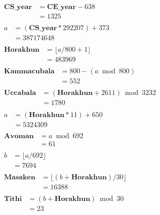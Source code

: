 \documentclass[11pt,oneside]{memoir-article}
\begin{document}
\begin{align}
\begin{split}
   \mathbf{CS\_year} &= \mathbf{CE\_year} - 638\\
                     &= 1325
\end{split}\\
\begin{split}
                   a &= (\mathbf{CS\_year} * 292207) + 373\\
                     &= 387174648
\end{split}\\
\begin{split}
\mathbf{Horakhun}    &= \lfloor a / 800 + 1 \rfloor\\
                     &= 483969
\end{split}\\
\begin{split}
\mathbf{Kammacubala} &= 800 - (a \bmod 800)\\
                     &= 552
\end{split}\\
\begin{split}
\mathbf{Uccabala}    &= (\mathbf{Horakhun} + 2611) \bmod 3232\\
                     &= 1780
\end{split}\\
\begin{split}
                   a &= (\mathbf{Horakhun} * 11) + 650\\
                     &= 5324309
\end{split}\\
\begin{split}
\mathbf{Avoman}      &= a \bmod 692\\
                     &= 61
\end{split}\\
\begin{split}
                   b &= \lfloor a / 692 \rfloor\\
                     &= 7694
\end{split}\\
\begin{split}
\mathbf{Masaken}     &= \lfloor (b + \mathbf{Horakhun}) / 30 \rfloor\\
                     &= 16388
\end{split}\\
\begin{split}
\mathbf{Tithi}       &= (b + \mathbf{Horakhun}) \bmod 30\\
                     &= 23
\end{split}
\end{align}
\end{document}
